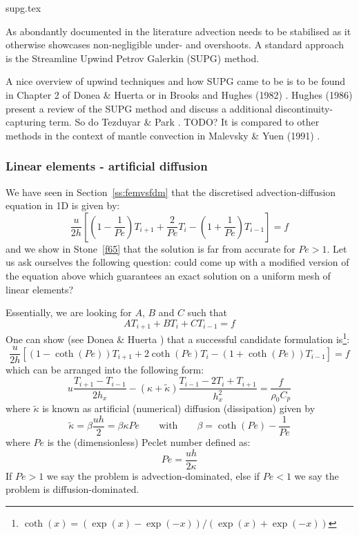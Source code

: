 \begin{flushright} {\tiny {\color{gray} supg.tex}} \end{flushright}

As abondantly documented in the literature advection needs to be stabilised
as it otherwise showcases non-negligible under- and overshoots.
A standard approach is the Streamline Upwind Petrov Galerkin (SUPG) method.

A nice overview of upwind techniques and how SUPG came to be is to be found in Chapter 
2 of Donea \& Huerta \cite{dohu03} or in Brooks and Hughes (1982) \cite{brhu82}.
Hughes \etal (1986) \cite{humm86} present a review of the SUPG method 
and discuss a additional discontinuity-capturing term. So do Tezduyar \& Park \cite{tepa86}.
TODO? It is compared to other methods in the context of mantle convection in 
Malevsky \& Yuen (1991) \cite{mayu91}. 







\subsubsection{Linear elements - artificial diffusion}

We have seen in Section~\ref{ss:femvsfdm} that the discretised advection-diffusion equation 
in 1D is given by:
\[
\frac{u}{2h}
\left[
\left(1-\frac{1}{Pe}\right) T_{i+1} + \frac{2}{Pe} T_i - \left(1+\frac{1}{Pe}\right)T_{i-1} 
\right] = f
\]
and we show in Stone~\ref{f65} that the solution is far from accurate for $Pe>1$. Let us ask ourselves the 
following question: could come up with a modified version of the equation above which 
guarantees an exact solution on a uniform mesh of linear elements?

Essentially, we are looking for $A$, $B$ and $C$ such that 
\[
A T_{i+1} + BT_i + C T_{i-1} = f
\]
One can show (see Donea \& Huerta \cite{dohu03}) that a successful candidate formulation 
is\footnote{$\coth(x)=(\exp(x)-\exp(-x))/(\exp(x)+\exp(-x))$}:
\[
\frac{u}{2h}
\left[
\left(1-\coth(Pe) \right) T_{i+1} + 2 \coth(Pe) T_i - \left(1+\coth(Pe)\right) T_{i-1} 
\right] = f
\]
which can be arranged into the following form:
\begin{equation}
u
\frac{T_{i+1}-T_{i-1}}{2h_x}
-
(\kappa+ \tilde{\kappa})
\frac{T_{i-1}-2T_i+T_{i+1}}{h_x^2}
= \frac{f}{\rho_0 C_p}
\end{equation}
where 
$\tilde{\kappa}$ is known as artificial (numerical) diffusion (dissipation) given by
\[
\tilde{\kappa}=\beta \frac{u h}{2} = \beta \kappa Pe
\qquad
\text{with}
\qquad
\beta = \coth (Pe) - \frac{1}{Pe}
\]
where $Pe$ is the (dimensionless) Peclet number defined as: 
\[
\boxed{
Pe= \frac{u h }{2 \kappa}
}
\]
If $Pe>1$ we say the problem is advection-dominated, 
else if $Pe<1$ we say the problem is diffusion-dominated.

